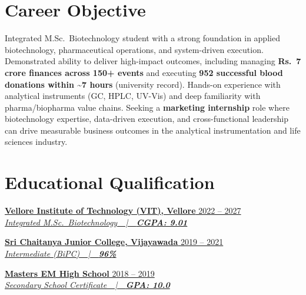 \documentclass[10pt, a4paper]{article}
\newcommand{\instentry}[3]{%
  \textbf{#1} \hfill #2 \\
  \textit{#3}%
}
\begin{document}
\section{Career Objective}

Integrated M.Sc.\ Biotechnology student with a strong foundation in applied biotechnology, pharmaceutical operations, and system-driven execution. Demonstrated ability to deliver high-impact outcomes, including managing \textbf{Rs.\ 7 crore finances across 150+ events} and executing \textbf{952 successful blood donations within \textasciitilde7 hours} (university record). Hands-on experience with analytical instruments (GC, HPLC, UV-Vis) and deep familiarity with pharma/biopharma value chains. Seeking a \textbf{marketing internship} role where biotechnology expertise, data-driven execution, and cross-functional leadership can drive measurable business outcomes in the analytical instrumentation and life sciences industry.

\vspace{2pt}

\section{Educational Qualification}

\href{https://drive.google.com/file/d/1MURK8z4sF1ZxJLiPiarqxK-zR6nW8Rob/view?usp=sharing}{\instentry{Vellore Institute of Technology (VIT), Vellore}%
  {2022 -- 2027}%
  {Integrated M.Sc.\ Biotechnology\ \ |\ \ \textbf{CGPA: 9.01}}}

\vspace{5pt}

\href{https://drive.google.com/file/d/13R-O5OhHZeRIpjm2o4nyuUF3UBJJaFrc/view?usp=sharing}{\instentry{Sri Chaitanya Junior College, Vijayawada}%
  {2019 -- 2021}%
  {Intermediate (BiPC)\ \ |\ \ \textbf{96\%}}}

\vspace{5pt}

\href{https://drive.google.com/file/d/13KkqJNk7TV_GUvXSlcIHSze3GFGcqrEO/view?usp=sharing}{\instentry{Masters EM High School}%
  {2018 -- 2019}%
  {Secondary School Certificate\ \ |\ \ \textbf{GPA: 10.0}}}

\end{document}

